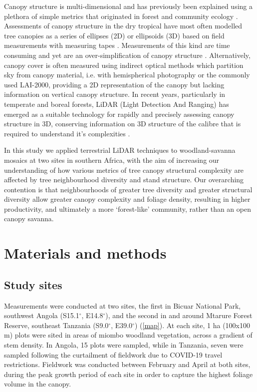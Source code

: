 \documentclass[11pt,a4paper]{article}
\begin{document}
Canopy structure is multi-dimensional and has previously been explained using a plethora of simple metrics that originated in forest and community ecology \citep{}. Assessments of canopy structure in the dry tropical have most often modelled tree canopies as a series of ellipses (2D) or ellipsoids (3D) based on field measurements with measuring tapes \citep{}. Measurements of this kind are time consuming and yet are an over-simplification of canopy structure \citep{}. Alternatively, canopy cover is often measured using indirect optical methods which partition sky from canopy material, i.e. with hemispherical photography or the commonly used LAI-2000, providing a 2D representation of the canopy but lacking information on vertical canopy structure. In recent years, particularly in temperate and boreal forests, LiDAR (Light Detection And Ranging) has emerged as a suitable technology for rapidly and precisely assessing canopy structure in 3D, conserving information on 3D structure of the calibre that is required to understand it's complexities \citep{}.

In this study we applied terrestrial LiDAR techniques to woodland-savanna mosaics at two sites in southern Africa, with the aim of increasing our understanding of how various metrics of tree canopy structural complexity are affected by tree neighbourhood diversity and stand structure. Our overarching contention is that neighbourhoods of greater tree diversity and greater structural diversity allow greater canopy complexity and foliage density, resulting in higher productivity, and ultimately a more `forest-like' community, rather than an open canopy savanna.

\section{Materials and methods}

\subsection{Study sites}

Measurements were conducted at two sites, the first in Bicuar National Park, southwest Angola (S15.1$^\circ$, E14.8$^\circ$), and the second in and around Mtarure Forest Reserve, southeast Tanzania (S9.0$^\circ$, E39.0$^\circ$) (\autoref{map}). At each site, 1 ha (100x100 m) plots were sited in areas of miombo woodland vegetation, across a gradient of stem density. In Angola, 15 plots were sampled, while in Tanzania, seven were sampled following the curtailment of fieldwork due to COVID-19 travel restrictions. Fieldwork was conducted between February and April at both sites, during the peak growth period of each site in order to capture the highest foliage volume in the canopy.
\end{document}
